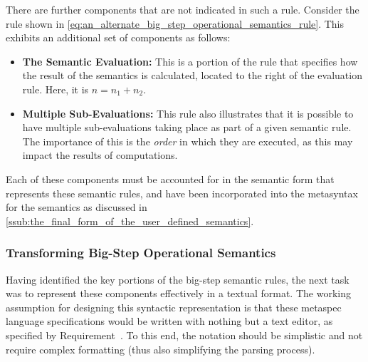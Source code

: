 There are further components that are not indicated in such a rule. 
Consider the rule shown in \autoref{eq:an_alternate_big_step_operational_semantics_rule}.
This exhibits an additional set of components as follows:
\begin{itemize}
    \item \textbf{The Semantic Evaluation:} This is a portion of the rule that specifies how the result of the semantics is calculated, located to the right of the evaluation rule. 
    Here, it is $n = n_1 + n_2$.
    \item \textbf{Multiple Sub-Evaluations:} This rule also illustrates that it is possible to have multiple sub-evaluations taking place as part of a given semantic rule. 
    The importance of this is the \textit{order} in which they are executed, as this may impact the results of computations. 
\end{itemize}

Each of these components must be accounted for in the semantic form that represents these semantic rules, and have been incorporated into the metasyntax for the semantics as discussed in \autoref{ssub:the_final_form_of_the_user_defined_semantics}.


\subsubsection{Transforming Big-Step Operational Semantics} %
\label{ssub:transforming_big_step_operational_semantics}

Having identified the key portions of the big-step semantic rules, the next task was to represent these components effectively in a textual format. 
The working assumption for designing this syntactic representation is that these \gls{metaspec} language specifications would be written with nothing but a text editor, as specified by Requirement~.
To this end, the notation should be simplistic and not require complex formatting (thus also simplifying the parsing process). \\

